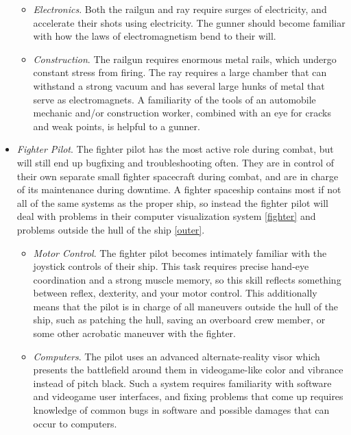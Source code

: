 \documentclass[a4paper]{article}
\begin{document}
\begin{itemize}
\begin{itemize}
\item \textit{Electronics}. Both the railgun and ray require surges of electricity, and accelerate their shots using electricity. The gunner should become familiar with how the laws of electromagnetism bend to their will.
\item \textit{Construction}. The railgun requires enormous metal rails, which undergo constant stress from firing. The ray requires a large chamber that can withstand a strong vacuum and has several large hunks of metal that serve as electromagnets. A familiarity of the tools of an automobile mechanic and/or construction worker, combined with an eye for cracks and weak points, is helpful to a gunner.
\end{itemize}
\item \textit{Fighter Pilot}. The fighter pilot has the most active role during combat, but will still end up bugfixing and troubleshooting often. They are in control of their own separate small fighter spacecraft during combat, and are in charge of its maintenance during downtime. A fighter spaceship contains most if not all of the same systems as the proper ship, so instead the fighter pilot will deal with problems in their computer visualization system \ref{fighter} and problems outside the hull of the ship \ref{outer}. 
\begin{itemize}
\item \textit{Motor Control}. The fighter pilot becomes intimately familiar with the joystick controls of their ship. This task requires precise hand-eye coordination and a strong muscle memory, so this skill reflects something between reflex, dexterity, and your motor control. This additionally means that the pilot is in charge of all maneuvers outside the hull of the ship, such as patching the hull, saving an overboard crew member, or some other acrobatic maneuver with the fighter.
\item \textit{Computers}. The pilot uses an advanced alternate-reality visor which presents the battlefield around them in videogame-like color and vibrance instead of pitch black. Such a system requires familiarity with software and videogame user interfaces, and fixing problems that come up requires knowledge of common bugs in software and possible damages that can occur to computers.
\end{itemize}
\end{itemize}
\end{document}
